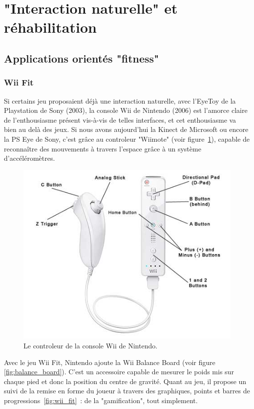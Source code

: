 \section{"Interaction naturelle" et réhabilitation}

\subsection{Applications orientés "fitness"}

\subsubsection{Wii Fit}

Si certains jeu proposaient déjà une interaction naturelle, avec l'EyeToy 
de la Playstation de Sony (2003), la console Wii de Nintendo (2006) est 
l'amorce claire de l'enthousiasme présent vis-à-vis de telles interfaces, et cet enthousiasme va bien
au delà des jeux. 
Si nous avons aujourd'hui la Kinect de Microsoft ou encore la
PS Eye de Sony, c'est grâce au controleur "Wiimote" (voir figure~\ref{fig:wii}), 
capable de reconnaître des mouvements à 
travers l'espace grâce à un système d'accéléromètres. 

\begin{figure}[h!]
\centering
\includegraphics[width=0.7\linewidth]{../images/wii_diagram}
\caption{Le controleur de la console Wii de Nintendo.}
\label{fig:wii}
\end{figure}

Avec le jeu Wii Fit, Nintendo ajoute la Wii Balance Board (voir figure 
\ref{fig:balance_board}). C'est un accessoire capable de mesurer le 
poids mis sur chaque pied et donc la position du centre de gravité. Quant au jeu,
il propose un suivi de la remise en forme du joueur à travers des graphiques, 
points et barres de progressions~\ref{fig:wii_fit}~: de la "gamification", 
tout simplement.

